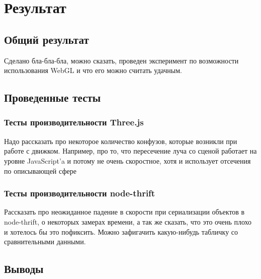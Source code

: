 \documentclass[12pt, a4paper]{article}
\let\stdsection\section
\renewcommand\section{\newpage\stdsection}
\begin{document}
\section{Результат}
\subsection{Общий результат}
Сделано бла-бла-бла, можно сказать, проведен эксперимент по возможности
использования WebGL и что его можно считать удачным.
\subsection{Проведенные тесты}
\subsubsection{Тесты производительности Three.js}
Надо рассказать про некоторое количество конфузов, которые возникли при работе
с движком. Например, про то, что пересечение луча со сценой работает на уровне
JavaScript'a и потому не очень скоростное, хотя и использует отсечения по
описывающей сфере
\subsubsection{Тесты производительности node-thrift}
Рассказать про неожиданное падение в скорости при сериализации объектов в
node-thrift, о некоторых замерах времени, а так же сказать, что это очень плохо
и хотелось бы это пофиксить. Можно зафигачить какую-нибудь табличку со
сравнительными данными.
\subsection{Выводы}
\end{document}

